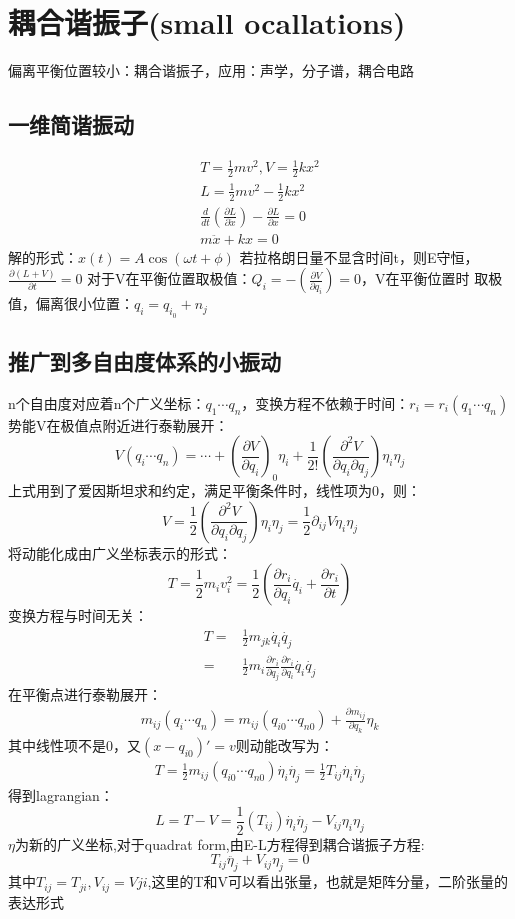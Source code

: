 \documentclass[UTF8,10pt]{article}
\begin{document}
\section{耦合谐振子(small ocallations)}
偏离平衡位置较小：耦合谐振子，应用：声学，分子谱，耦合电路
\subsection{一维简谐振动}
\begin{gather*}
    T=\frac{1}{2}mv^2,V=\frac{1}{2}kx^2\\
    L=\frac{1}{2}mv^2-\frac{1}{2}kx^2\\
    \frac{d}{dt}(\frac{\partial L}{\partial\dot{x}})-\frac{\partial L}{\partial x}=0\\
    m\ddot{x}+kx=0
\end{gather*}
解的形式：$x(t)=A\cos( \omega t+\phi)$
若拉格朗日量不显含时间t，则E守恒，$\frac{\partial (L+V)}{\partial t}=0$
对于V在平衡位置取极值：$Q_i=-(\frac{\partial V}{\partial q_i})=0$，V在平衡位置时
取极值，偏离很小位置：$q_i=q_{i_0}+n_j$
\subsection{推广到多自由度体系的小振动}
n个自由度对应着n个广义坐标：$q_1\cdots q_n$，变换方程不依赖于时间：$r_i=r_i(q_1\cdots q_n)
$势能V在极值点附近进行泰勒展开：
\begin{equation*}
    V(q_i\cdots q_n)=\cdots+(\frac{\partial V}{\partial q_i})_0\eta_i
    +\frac{1}{2!}(\frac{\partial^2 V}{\partial q_i \partial q_j})\eta_i\eta_j
\end{equation*}
上式用到了爱因斯坦求和约定，满足平衡条件时，线性项为0，则：
\[V=\frac{1}{2}(\frac{\partial^2 V}{\partial q_i \partial q_j })\eta_i\eta_j
    =\frac{1}{2}\partial_{ij}V \eta_i\eta_j\]
将动能化成由广义坐标表示的形式：
\[T=\frac{1}{2}m_i v_i^2=\frac{1}{2}(\frac{\partial r_i}{\partial q_i}\dot{q_i}+\frac{\partial r_i}{\partial t})\]
变换方程与时间无关：
\begin{align*}
    T= & \frac{1}{2}m_{jk}\dot{q_i}\dot{q_j} \\=&\frac{1}{2}m_i\frac{\partial r_i}{\partial q_j}\frac{\partial r_i}{\partial q_i}\dot{q_i}\dot{q_j}
\end{align*}
在平衡点进行泰勒展开：
\begin{gather*}
    m_{ij}(q_i\cdots q_n)=m_{ij}(q_{i0}\cdots q_{n0})+\frac{\partial m_{ij}}{\partial q_k}\eta_k
\end{gather*}
其中线性项不是0，又$(x-q_{i0})'=v$则动能改写为：
\begin{gather*}
    T=\frac{1}{2}m_{ij}(q_{i0}\cdots q_{n0})\dot{\eta_i}\dot{\eta _j}=\frac{1}{2}T_{ij}\dot{\eta_i}\dot{\eta_j}
\end{gather*}
得到lagrangian：
\[L=T-V=\frac{1}{2}(T_{ij})\dot{\eta_i}\dot{\eta _j}-V_{ij}\eta_i\eta_j\]
$\eta$为新的广义坐标,对于quadrat form,由E-L方程得到耦合谐振子方程:
\[T_{ij}\ddot{\eta_j}+V_{ij}\eta_j=0\]
其中$T_{ij}=T_{ji},V_{ij}=V{ji}$,这里的T和V可以看出张量，也就是矩阵分量，二阶张量的
表达形式
\end{document}

